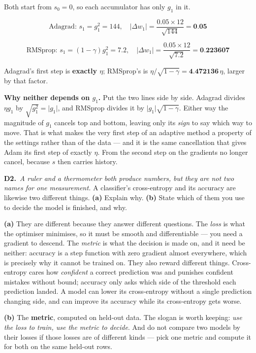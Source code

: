 \documentclass[10pt,a4paper]{article}
\newcommand{\sol}[1]{\textbf{#1}}
\begin{document}
\vspace{2pt}

Both start from $s_0 = 0$, so each accumulator has only $g_1$ in it.

\[ \text{Adagrad: } s_1 = g_1^2 = 144, \quad \lvert \Delta w_1 \rvert = \frac{0.05 \times 12}{\sqrt{144}} = \sol{0.05} \]

\[ \text{RMSprop: } s_1 = (1-\gamma) g_1^2 = 7.2, \quad \lvert \Delta w_1 \rvert = \frac{0.05 \times 12}{\sqrt{7.2}} = \sol{0.223607} \]

Adagrad's first step is \sol{exactly $\eta$}; RMSprop's is $\eta/\sqrt{1-\gamma} = \sol{4.472136}\,\eta$, larger by that factor.

\vspace{2pt}

\textbf{Why neither depends on $g_1$.} Put the two lines side by side. Adagrad divides $\eta g_1$ by $\sqrt{g_1^2} = \lvert g_1 \rvert$, and RMSprop divides it by $\lvert g_1 \rvert \sqrt{1-\gamma}$. Either way the magnitude of $g_1$ cancels top and bottom, leaving only its \emph{sign} to say which way to move. That is what makes the very first step of an adaptive method a property of the settings rather than of the data --- and it is the same cancellation that gives Adam its first step of exactly $\eta$. From the second step on the gradients no longer cancel, because $s$ then carries history.

\vspace{6pt}

\textbf{D2.}\ \emph{A ruler and a thermometer both produce numbers, but they are not two names for one measurement.} A classifier's cross-entropy and its accuracy are likewise two different things. \textbf{(a)} Explain why. \textbf{(b)} State which of them you use to decide the model is finished, and why.

\vspace{2pt}

\textbf{(a)} They are different because they answer different questions. The \emph{loss} is what the optimiser minimises, so it must be smooth and differentiable --- you need a gradient to descend. The \emph{metric} is what the decision is made on, and it need be neither: accuracy is a step function with zero gradient almost everywhere, which is precisely why it cannot be trained on. They also reward different things. Cross-entropy cares how \emph{confident} a correct prediction was and punishes confident mistakes without bound; accuracy only asks which side of the threshold each prediction landed. A model can lower its cross-entropy without a single prediction changing side, and can improve its accuracy while its cross-entropy gets worse.\par\vspace{1mm}\textbf{(b)} The \textbf{metric}, computed on held-out data. The slogan is worth keeping: \emph{use the loss to train, use the metric to decide}. And do not compare two models by their losses if those losses are of different kinds --- pick one metric and compute it for both on the same held-out rows.
\end{document}
